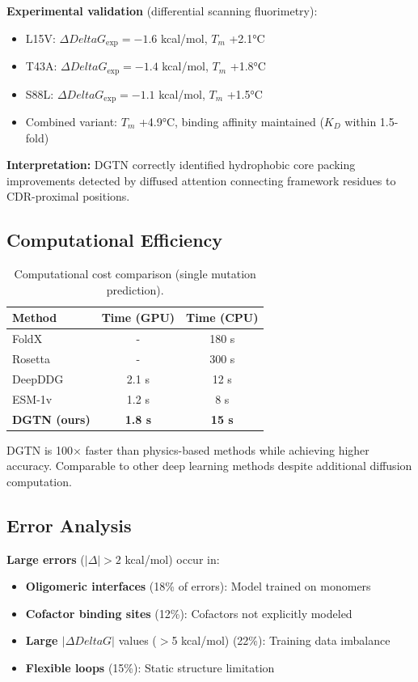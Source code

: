\documentclass[11pt]{article}
\begin{document}
\textbf{Experimental validation} (differential scanning fluorimetry):
\begin{itemize}
    \item L15V: $\Delta Delta G_{\text{exp}} = -1.6$ kcal/mol, $T_m$ +2.1°C
    \item T43A: $\Delta Delta G_{\text{exp}} = -1.4$ kcal/mol, $T_m$ +1.8°C
    \item S88L: $\Delta Delta G_{\text{exp}} = -1.1$ kcal/mol, $T_m$ +1.5°C
    \item Combined variant: $T_m$ +4.9°C, binding affinity maintained ($K_D$ within 1.5-fold)
\end{itemize}

\textbf{Interpretation:} DGTN correctly identified hydrophobic core packing improvements detected by diffused attention connecting framework residues to CDR-proximal positions.

\subsection{Computational Efficiency}

\begin{table}[t]
\centering
\caption{Computational cost comparison (single mutation prediction).}
\label{tab:efficiency}
\begin{tabular}{lcc}
\toprule
\textbf{Method} & \textbf{Time (GPU)} & \textbf{Time (CPU)} \\
\midrule
FoldX & - & 180 s \\
Rosetta & - & 300 s \\
DeepDDG & 2.1 s & 12 s \\
ESM-1v & 1.2 s & 8 s \\
\textbf{DGTN (ours)} & \textbf{1.8 s} & \textbf{15 s} \\
\bottomrule
\end{tabular}
\end{table}

DGTN is 100× faster than physics-based methods while achieving higher accuracy. Comparable to other deep learning methods despite additional diffusion computation.

\subsection{Error Analysis}

\textbf{Large errors} ($|\Delta| > 2$ kcal/mol) occur in:
\begin{itemize}
    \item \textbf{Oligomeric interfaces} (18\% of errors): Model trained on monomers
    \item \textbf{Cofactor binding sites} (12\%): Cofactors not explicitly modeled
    \item \textbf{Large $|\Delta Delta G|$} values ($>$5 kcal/mol) (22\%): Training data imbalance
    \item \textbf{Flexible loops} (15\%): Static structure limitation
\end{itemize}
\end{document}
